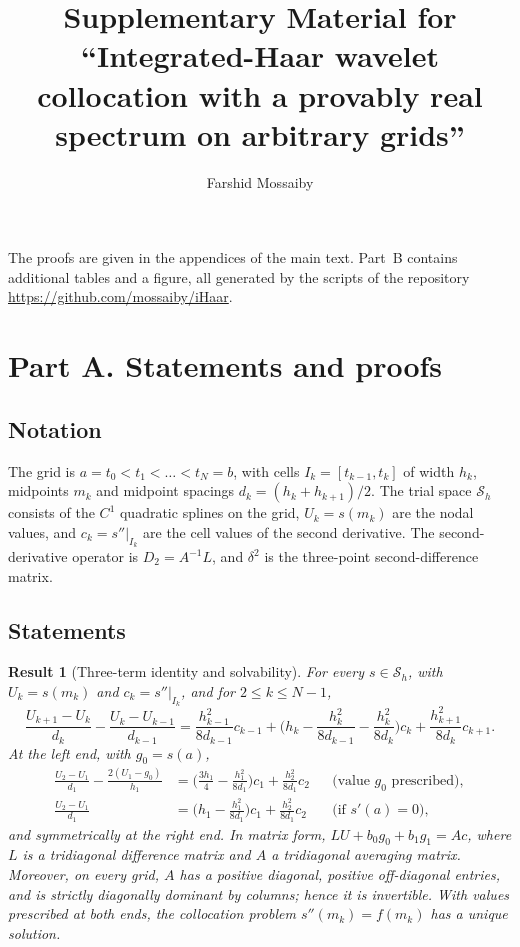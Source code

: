 \documentclass[11pt]{article}
\title{Supplementary Material for\\ ``Integrated-Haar wavelet collocation with a provably real spectrum on arbitrary grids''}
\author{Farshid Mossaiby}
\date{}
\newif\ifincludeproof \includeprooffalse
\newtheorem{result}{Result}
\begin{document}
\maketitle
\noindent The proofs are given in the appendices of the main text. Part~B contains additional
tables and a figure, all generated by the scripts of the repository \url{https://github.com/mossaiby/iHaar}.

\ifincludeproof
\section*{Part A. Statements and proofs}
\subsection*{Notation}
The grid is $a=t_0<t_1<\dots<t_N=b$, with cells $I_k=[t_{k-1},t_k]$ of width $h_k$, midpoints $m_k$ and midpoint
spacings $d_k=(h_k+h_{k+1})/2$. The trial space $\mathcal S_h$ consists of the $C^1$ quadratic splines on the
grid, $U_k=s(m_k)$ are the nodal values, and $c_k=s''|_{I_k}$ are the cell values of the second derivative.
The second-derivative operator is $D_2=A^{-1}L$, and $\delta^2$ is the three-point second-difference matrix.

\subsection*{Statements}
\begin{result}[Three-term identity and solvability]\label{thm:identity}
For every $s\in\mathcal S_h$, with $U_k=s(m_k)$ and $c_k=s''|_{I_k}$, and for $2\le k\le N-1$,
\begin{equation}\label{eq:interior}
\frac{U_{k+1}-U_k}{d_k}-\frac{U_k-U_{k-1}}{d_{k-1}}
=\frac{h_{k-1}^2}{8d_{k-1}}c_{k-1}+\Big(h_k-\frac{h_k^2}{8d_{k-1}}-\frac{h_k^2}{8d_k}\Big)c_k+\frac{h_{k+1}^2}{8d_k}c_{k+1}.
\end{equation}
At the left end, with $g_0=s(a)$,
\begin{align}
\frac{U_2-U_1}{d_1}-\frac{2(U_1-g_0)}{h_1}&=\Big(\frac{3h_1}{4}-\frac{h_1^2}{8d_1}\Big)c_1+\frac{h_2^2}{8d_1}c_2 &&\text{(value $g_0$ prescribed)},\label{eq:dirrow}\\
\frac{U_2-U_1}{d_1}&=\Big(h_1-\frac{h_1^2}{8d_1}\Big)c_1+\frac{h_2^2}{8d_1}c_2 &&\text{(if } s'(a)=0),\label{eq:neurow}
\end{align}
and symmetrically at the right end. In matrix form, $LU+b_0g_0+b_1g_1=Ac$, where $L$ is a tridiagonal
difference matrix and $A$ a tridiagonal averaging matrix.
Moreover, on every grid, $A$ has a positive diagonal, positive off-diagonal entries, and is strictly diagonally
dominant by columns; hence it is invertible. With values prescribed at both ends, the collocation
problem $s''(m_k)=f(m_k)$ has a unique solution.
\end{result}
\end{document}
